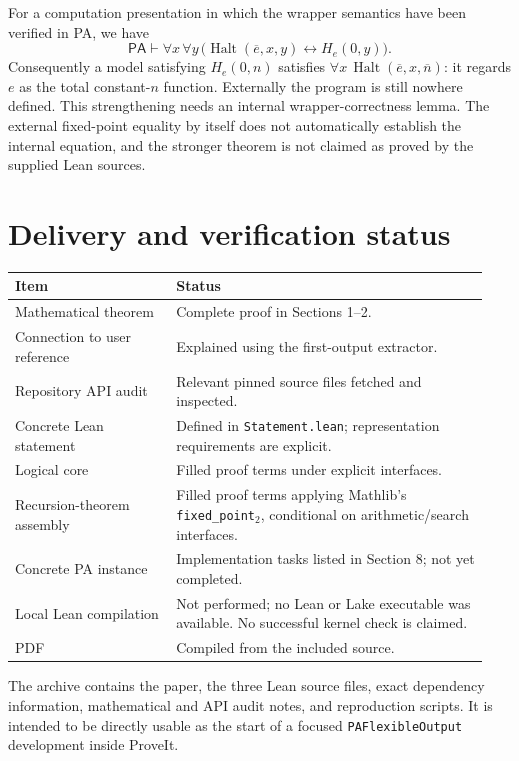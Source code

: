 \documentclass[11pt]{article}
\newcommand{\PA}{\mathsf{PA}}
\newcommand{\Halt}{\operatorname{Halt}}
\newcommand{\num}[1]{\overline{#1}}
\theoremstyle{definition}
\theoremstyle{remark}
\begin{document}
For a computation presentation in which the wrapper semantics have been
verified in PA, we have
\[
 \PA\vdash\forall x\,\forall y\,
   \bigl(\Halt(\num e,x,y)\leftrightarrow H_e(0,y)\bigr).
\]
Consequently a model satisfying $H_e(0,n)$ satisfies
$\forall x\,\Halt(\num e,x,\num n)$: it regards $e$ as the total
constant-$n$ function. Externally the program is still nowhere defined.
This strengthening needs an internal wrapper-correctness lemma. The
external fixed-point equality by itself does not automatically establish
the internal equation, and the stronger theorem is not claimed as proved
by the supplied Lean sources.

\section{Delivery and verification status}

\begin{longtable}{@{}p{0.32\linewidth}p{0.62\linewidth}@{}}
\toprule
Item & Status\\
\midrule
Mathematical theorem & Complete proof in Sections 1--2.\\
Connection to user reference & Explained using the first-output extractor.\\
Repository API audit & Relevant pinned source files fetched and inspected.\\
Concrete Lean statement & Defined in \texttt{Statement.lean}; representation
requirements are explicit.\\
Logical core & Filled proof terms under explicit interfaces.\\
Recursion-theorem assembly & Filled proof terms applying Mathlib's
\texttt{fixed\_point}$_2$, conditional on arithmetic/search interfaces.\\
Concrete PA instance & Implementation tasks listed in Section 8; not yet
completed.\\
Local Lean compilation & Not performed; no Lean or Lake executable was
available. No successful kernel check is claimed.\\
PDF & Compiled from the included source.\\
\bottomrule
\end{longtable}

The archive contains the paper, the three Lean source files, exact
dependency information, mathematical and API audit notes, and
reproduction scripts. It is intended to be directly usable as the start
of a focused \texttt{PAFlexibleOutput} development inside ProveIt.
\end{document}
